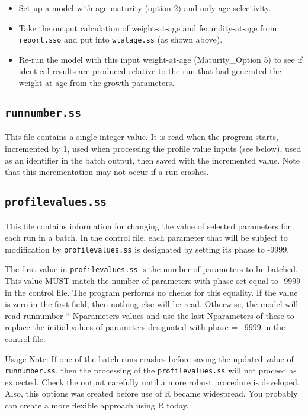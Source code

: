 		\begin{itemize}
			\item Set-up a model with age-maturity (option 2) and only age selectivity.
			\item Take the output calculation of weight-at-age and fecundity-at-age  from \verb|report.sso| and put into \verb|wtatage.ss| (as shown above).
			\item Re-run the model with this input weight-at-age (Maturity\_Option 5) to see if identical results are produced relative to the run that had generated the weight-at-age from the growth parameters.
		\end{itemize}


\subsection{\verb|runnumber.ss|}
This file contains a single integer value. It is read when the program starts, incremented by 1, used when processing the profile value inputs (see below), used as an identifier in the batch output, then saved with the incremented value. Note that this incrementation may not occur if a run crashes.

\subsection{\verb|profilevalues.ss|}	
This file contains information for changing the value of selected parameters for each run in a batch. In the control file, each parameter that will be subject to modification by \verb|profilevalues.ss| is designated by setting its phase to -9999.

The first value in \verb|profilevalues.ss| is the number of parameters to be batched. This value MUST match the number of parameters with phase set equal to -9999 in the control file. The program performs no checks for this equality. If the value is zero in the first field, then nothing else will be read. Otherwise, the model will read runnumber * Nparameters values and use the last Nparameters of these to replace the initial values of parameters designated with phase = --9999 in the control file.

Usage Note: If one of the batch runs crashes before saving the updated value of \verb|runnumber.ss|, then the processing of the \verb|profilevalues.ss| will not proceed as expected. Check the output carefully until a more robust procedure is developed. Also, this options was created before use of R became widespread. You probably can create a more flexible approach using R today.


\pagebreak